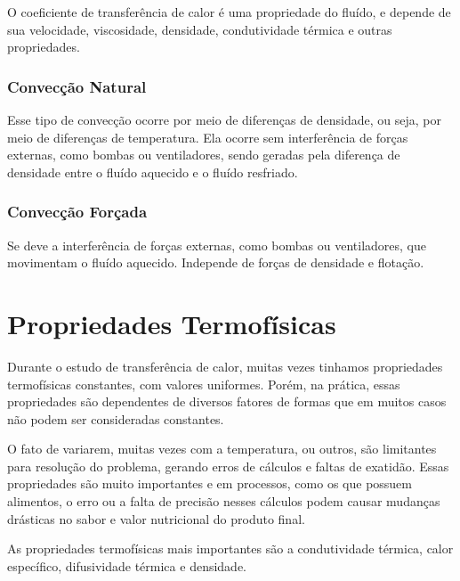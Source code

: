 O coeficiente de transferência de calor é uma propriedade do fluído, e depende de sua velocidade,
viscosidade, densidade, condutividade térmica e outras propriedades. \par

\subsubsection{Convecção Natural}
Esse tipo de convecção ocorre por meio de diferenças de densidade, ou seja, por meio de diferenças
de temperatura. Ela ocorre sem interferência de forças externas, como bombas ou ventiladores, sendo
geradas pela diferença de densidade entre o fluído aquecido e o fluído resfriado. \par

\subsubsection{Convecção Forçada}
Se deve a interferência de forças externas, como bombas ou ventiladores, que movimentam o fluído
aquecido. Independe de forças de densidade e flotação. \par
\section{Propriedades Termofísicas}
Durante o estudo de transferência de calor, muitas vezes tinhamos propriedades termofísicas
constantes, com valores uniformes. Porém, na prática, essas propriedades são dependentes de diversos
fatores de formas que em muitos casos não podem ser consideradas constantes. \par

O fato de variarem, muitas vezes com a temperatura, ou outros, são limitantes para resolução do
problema, gerando erros de cálculos e faltas de exatidão. Essas propriedades são muito importantes e
em processos, como os que possuem alimentos, o erro ou a falta de precisão nesses cálculos podem
causar mudanças drásticas no sabor e valor nutricional do produto final. \par

As propriedades termofísicas mais importantes são a condutividade térmica, calor específico,
difusividade térmica e densidade. \par
